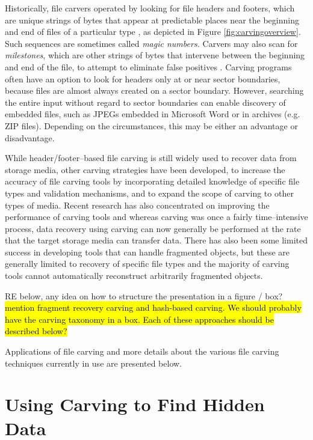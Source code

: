 Historically, file carvers operated by looking for file headers and
footers, which are unique strings of bytes that appear at predictable
places near the beginning and end of files of a particular type
\cite{Foremost, Scalpel}, as depicted in Figure \ref{fig:carvingoverview}.
Such sequences are sometimes called
\emph{magic numbers.} Carvers may also scan for \emph{milestones}, which
are other strings of bytes that intervene between the beginning and
end of the file, to attempt to eliminate false positives 
\label{def:milestones}.  Carving programs often have an option to look for headers
only at or near sector boundaries, because files are almost always
created on a sector boundary.  However, searching the entire input
without regard to sector boundaries can enable discovery of embedded
files, such as JPEGs embedded in Microsoft Word or in archives
(e.g. ZIP files).  Depending on the circumstances, this may be either
an advantage or disadvantage. 

While header/footer--based file carving is still widely used to
recover data from storage media, other carving strategies have been
developed, to increase the accuracy of file carving tools by
incorporating detailed knowledge of specific file types and validation
mechanisms, and to expand the scope of carving to other types of
media.  Recent research has also concentrated on improving the
performance of carving tools and whereas carving was once a fairly
time--intensive process, data recovery using carving can now generally
be performed at the rate that the target storage media can transfer
data.  There has also been some limited success in developing tools
that can handle fragmented objects, but these are generally limited to
recovery of specific file types and the majority of carving tools
cannot automatically reconstruct arbitrarily fragmented
objects. 

\color{red}

RE below, any idea on how to structure the presentation in a figure / box?
\hl{mention fragment recovery carving and hash-based carving. We should probably have the
  carving taxonomy in a box. Each of these approaches should be
  described below?}
\color{black}

Applications of file carving and more details about the various file carving techniques currently in use are presented below.

\section{Using Carving to Find Hidden Data}

